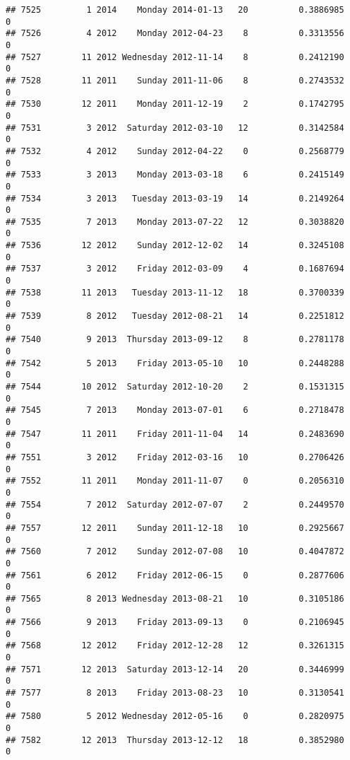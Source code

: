 \documentclass[
]{article}
\begin{document}
\begin{verbatim}
## 7525         1 2014    Monday 2014-01-13   20          0.3886985             0
## 7526         4 2012    Monday 2012-04-23    8          0.3313556             0
## 7527        11 2012 Wednesday 2012-11-14    8          0.2412190             0
## 7528        11 2011    Sunday 2011-11-06    8          0.2743532             0
## 7530        12 2011    Monday 2011-12-19    2          0.1742795             0
## 7531         3 2012  Saturday 2012-03-10   12          0.3142584             0
## 7532         4 2012    Sunday 2012-04-22    0          0.2568779             0
## 7533         3 2013    Monday 2013-03-18    6          0.2415149             0
## 7534         3 2013   Tuesday 2013-03-19   14          0.2149264             0
## 7535         7 2013    Monday 2013-07-22   12          0.3038820             0
## 7536        12 2012    Sunday 2012-12-02   14          0.3245108             0
## 7537         3 2012    Friday 2012-03-09    4          0.1687694             0
## 7538        11 2013   Tuesday 2013-11-12   18          0.3700339             0
## 7539         8 2012   Tuesday 2012-08-21   14          0.2251812             0
## 7540         9 2013  Thursday 2013-09-12    8          0.2781178             0
## 7542         5 2013    Friday 2013-05-10   10          0.2448288             0
## 7544        10 2012  Saturday 2012-10-20    2          0.1531315             0
## 7545         7 2013    Monday 2013-07-01    6          0.2718478             0
## 7547        11 2011    Friday 2011-11-04   14          0.2483690             0
## 7551         3 2012    Friday 2012-03-16   10          0.2706426             0
## 7552        11 2011    Monday 2011-11-07    0          0.2056310             0
## 7554         7 2012  Saturday 2012-07-07    2          0.2449570             0
## 7557        12 2011    Sunday 2011-12-18   10          0.2925667             0
## 7560         7 2012    Sunday 2012-07-08   10          0.4047872             0
## 7561         6 2012    Friday 2012-06-15    0          0.2877606             0
## 7565         8 2013 Wednesday 2013-08-21   10          0.3105186             0
## 7566         9 2013    Friday 2013-09-13    0          0.2106945             0
## 7568        12 2012    Friday 2012-12-28   12          0.3261315             0
## 7571        12 2013  Saturday 2013-12-14   20          0.3446999             0
## 7577         8 2013    Friday 2013-08-23   10          0.3130541             0
## 7580         5 2012 Wednesday 2012-05-16    0          0.2820975             0
## 7582        12 2013  Thursday 2013-12-12   18          0.3852980             0

\end{verbatim}
\end{document}
